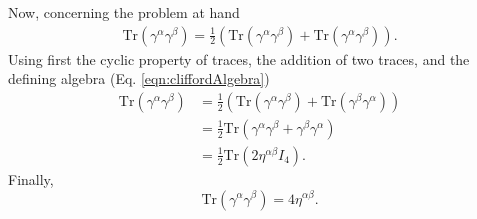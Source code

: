 Now, concerning the problem at hand
\begin{align*}
\text{Tr}(\gamma^\alpha \gamma^\beta)=\frac{1}{2}(\text{Tr}(\gamma^\alpha
\gamma^\beta)+\text{Tr}(\gamma^\alpha
\gamma^\beta)).
\end{align*}
Using first the cyclic property of traces, the addition of two traces, and the
defining algebra
(Eq. \eqref{eqn:cliffordAlgebra})
\begin{align*}
\text{Tr}(\gamma^\alpha
\gamma^\beta)&=\frac{1}{2}(\text{Tr}(\gamma^\alpha\gamma^\beta)+\text{Tr}(\gamma^\beta\gamma^\alpha))\\
&=\frac{1}{2}\text{Tr}(\gamma^\alpha\gamma^\beta+\gamma^\beta\gamma^\alpha)\\
&=\frac{1}{2}\text{Tr}(2\eta^{\alpha\beta}I_4).
\end{align*}
Finally,
\begin{equation}\label{eqn:griffithsRule12}
\text{Tr}(\gamma^\alpha\gamma^\beta)=4\eta^{\alpha\beta}.
\end{equation}


